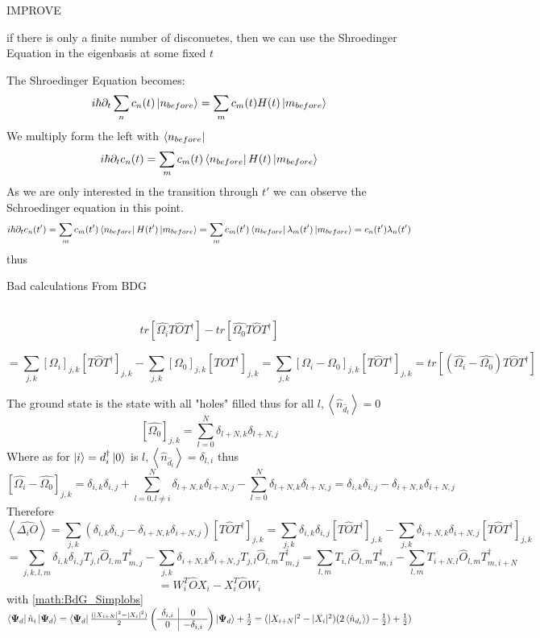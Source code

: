 \documentclass[Master]{subfiles}
\begin{document}
IMPROVE

if there is only a finite number of disconuetes, then we can use the Shroedinger Equation in the eigenbasis at some fixed $t$ 


The Shroedinger Equation becomes:
$$i \hbar \partial_t \sum_n c_n(t)\ket{n_{before}}  =\sum_m c_m(t) H(t)\ket{m_{before}}$$
We multiply form the left with $\bra{n_{before}}$
$$i \hbar \partial_t c_n(t) =\sum_m c_m(t) \bra{n_{before}}H(t)\ket{m_{before}}$$
As we are only interested in the transition through $t'$ we can observe the Schroedinger equation in this point.
$$i \hbar \partial_t c_n(t') =\sum_m c_m(t') \bra{n_{before}}H(t')\ket{m_{before}} = \sum_m c_m(t') \bra{n_{before}}\lambda_m(t')\ket{m_{before}} = c_n(t')\lambda_n(t')$$
thus

Bad calculations From BDG 

\\

$$
tr\left[\hat{\Omega_i} T\hat{O}T^{\dag} \right]-tr\left[\hat{\Omega_0} T\hat{O}T^{\dag} \right]
$$

$$
= \sum_{j,k} [\Omega_i]_{j,k} [T\hat{O}T^{\dag} ]_{j,k} - \sum_{j,k} [\Omega_0]_{j,k} [T\hat{O}T^{\dag} ]_{j,k} = \sum_{j,k} [\Omega_i-\Omega_0]_{j,k} [T\hat{O}T^{\dag} ]_{j,k}= tr\left[(\hat{\Omega_i}-\hat{\Omega_0}) T\hat{O}T^{\dag} \right]
$$

The ground state is the state with all "holes" filled thus for all $l, \left<\hat{n}_{\hat{d}_l}\right> = 0$
$$
[\hat{\Omega_0}]_{j,k} = \sum_{l=0}^N \delta_{l+N,k}\delta_{l+N,j}
$$
Where as for $\ket{i} = d_i^{\dag}\ket{0}$ is  $l, \left<\hat{n}_{\hat{d}_l}\right> = \delta_{l,i}$
thus 
$$ [\hat{\Omega_i}-\hat{\Omega_0}]_{j,k} 
= \delta_{i,k}\delta_{i,j}
+\sum_{l=0,l\neq i}^N \delta_{l+N,k}\delta_{l+N,j} 
- \sum_{l=0}^N \delta_{l+N,k}\delta_{l+N,j} = \delta_{i,k}\delta_{i,j} - \delta_{i+N,k}\delta_{i+N,j}
$$ 
Therefore 
$$
\left<\hat{\Delta_{i}O}\right> = \sum_{j,k} ( \delta_{i,k}\delta_{i,j} - \delta_{i+N,k}\delta_{i+N,j}) [T\hat{O}T^{\dag} ]_{j,k} 
= \sum_{j,k} \delta_{i,k}\delta_{i,j} [T\hat{O}T^{\dag} ]_{j,k} - \sum_{j,k} \delta_{i+N,k}\delta_{i+N,j} [T\hat{O}T^{\dag} ]_{j,k}
$$
$$
= \sum_{j,k,l,m} \delta_{i,k}\delta_{i,j} T_{j,l} \hat{O}_{l,m}T^{\dag}_{m,j}  - \sum_{j,k} \delta_{i+N,k}\delta_{i+N,j} T_{j,l} \hat{O}_{l,m}T^{\dag}_{m,j}
= \sum_{l,m}  T_{i,l} \hat{O}_{l,m}T^{\dag}_{m,i}  - \sum_{l,m} T_{i+N,l} \hat{O}_{l,m}T^{\dag}_{m,i+N}
$$
$$
= W_i^{T} \hat{O} X_i - X_i^{T} \hat{O} W_i
$$
with \eqref{math:BdG_Simplobs}\\
 \begin{math}
 \centering
 \bra{\vec{\Psi}_d}\hat{n}_i
\ket{\vec{\Psi}_d} = \bra{\vec{\Psi}_d}\frac{(|X_{i+N}|^2 - |X_i|^2)}{2}\left(
\begin{array}{c|c}
   \delta_{i,i}  &  0\\
   \hline 
   0 & -\delta_{i,i}
\end{array}\right)
\ket{\vec{\Psi}_d}+\frac{1}{2}
= 
(|X_{i+N}|^2 - |X_i|^2)(2\left<\hat{n}_{d_i}\right>)- \frac{1}{2})+\frac{1}{2})
\end{math}\\
\\
\end{document}
